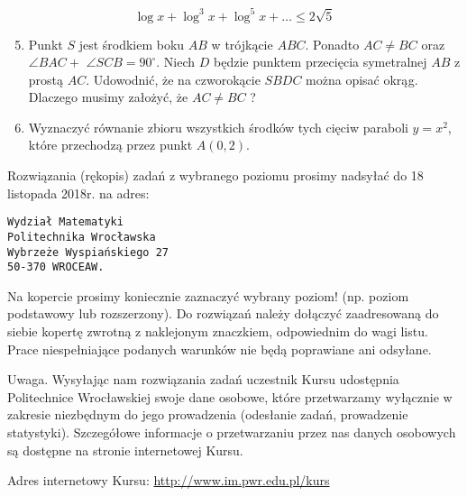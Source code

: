 \documentclass[10pt]{article}
\begin{document}
$$
\log x+\log ^{3} x+\log ^{5} x+\ldots \leqslant 2 \sqrt{5}
$$

\begin{enumerate}
  \setcounter{enumi}{4}
  \item Punkt $S$ jest środkiem boku $A B$ w trójkącie $A B C$. Ponadto $A C \neq B C$ oraz $\angle B A C+$ $\angle S C B=90^{\circ}$. Niech $D$ będzie punktem przecięcia symetralnej $A B$ z prostą $A C$. Udowodnić, że na czworokącie $S B D C$ można opisać okrąg. Dlaczego musimy założyć, że $A C \neq B C$ ?
  \item Wyznaczyć równanie zbioru wszystkich środków tych cięciw paraboli $y=x^{2}$, które przechodzą przez punkt $A(0,2)$.
\end{enumerate}

Rozwiązania (rękopis) zadań z wybranego poziomu prosimy nadsyłać do 18 listopada 2018r. na adres:

\begin{verbatim}
Wydział Matematyki
Politechnika Wrocławska
Wybrzeże Wyspiańskiego 27
50-370 WROCEAW.
\end{verbatim}

Na kopercie prosimy koniecznie zaznaczyć wybrany poziom! (np. poziom podstawowy lub rozszerzony). Do rozwiązań należy dołączyć zaadresowaną do siebie kopertę zwrotną z naklejonym znaczkiem, odpowiednim do wagi listu. Prace niespełniające podanych warunków nie będą poprawiane ani odsyłane.

Uwaga. Wysyłając nam rozwiązania zadań uczestnik Kursu udostępnia Politechnice Wrocławskiej swoje dane osobowe, które przetwarzamy wyłącznie w zakresie niezbędnym do jego prowadzenia (odesłanie zadań, prowadzenie statystyki). Szczegółowe informacje o przetwarzaniu przez nas danych osobowych są dostępne na stronie internetowej Kursu.

Adres internetowy Kursu: \href{http://www.im.pwr.edu.pl/kurs}{http://www.im.pwr.edu.pl/kurs}
\end{document}
